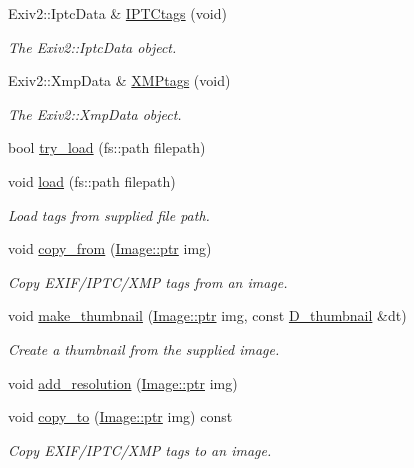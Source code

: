 \begin{DoxyCompactItemize}
Exiv2\+::\+Iptc\+Data \& \hyperlink{class_photo_finish_1_1_tags_aafa729966f296935a69951e094ee7668}{I\+P\+T\+Ctags} (void)
\begin{DoxyCompactList}\small\item\em The Exiv2\+::\+Iptc\+Data object. \end{DoxyCompactList}\item 
Exiv2\+::\+Xmp\+Data \& \hyperlink{class_photo_finish_1_1_tags_a59d39abc7bc6fd55e14aa9e17a07f220}{X\+M\+Ptags} (void)
\begin{DoxyCompactList}\small\item\em The Exiv2\+::\+Xmp\+Data object. \end{DoxyCompactList}\item 
bool \hyperlink{class_photo_finish_1_1_tags_ab798e399cc1588fa010c6e64c060c9f1}{try\+\_\+load} (fs\+::path filepath)
\item 
void \hyperlink{class_photo_finish_1_1_tags_a0587ca696bee570efb8cb799a6126b76}{load} (fs\+::path filepath)
\begin{DoxyCompactList}\small\item\em Load tags from supplied file path. \end{DoxyCompactList}\item 
void \hyperlink{class_photo_finish_1_1_tags_a55793c73da1d7c982bf8285f829bc80f}{copy\+\_\+from} (\hyperlink{class_photo_finish_1_1_image_ab336203305ed3a1397d7245063353b5a}{Image\+::ptr} img)
\begin{DoxyCompactList}\small\item\em Copy E\+X\+I\+F/\+I\+P\+T\+C/\+X\+MP tags from an image. \end{DoxyCompactList}\item 
void \hyperlink{class_photo_finish_1_1_tags_ad13fda695ce72a1059f2797ef2968a9e}{make\+\_\+thumbnail} (\hyperlink{class_photo_finish_1_1_image_ab336203305ed3a1397d7245063353b5a}{Image\+::ptr} img, const \hyperlink{class_photo_finish_1_1_d__thumbnail}{D\+\_\+thumbnail} \&dt)
\begin{DoxyCompactList}\small\item\em Create a thumbnail from the supplied image. \end{DoxyCompactList}\item 
void \hyperlink{class_photo_finish_1_1_tags_aae062461270678541595404f0d277ef0}{add\+\_\+resolution} (\hyperlink{class_photo_finish_1_1_image_ab336203305ed3a1397d7245063353b5a}{Image\+::ptr} img)
\item 
void \hyperlink{class_photo_finish_1_1_tags_afd3ddbd68aae48ff6ae9d71896e4ccc4}{copy\+\_\+to} (\hyperlink{class_photo_finish_1_1_image_ab336203305ed3a1397d7245063353b5a}{Image\+::ptr} img) const
\begin{DoxyCompactList}\small\item\em Copy E\+X\+I\+F/\+I\+P\+T\+C/\+X\+MP tags to an image. \end{DoxyCompactList}\end{DoxyCompactItemize}


